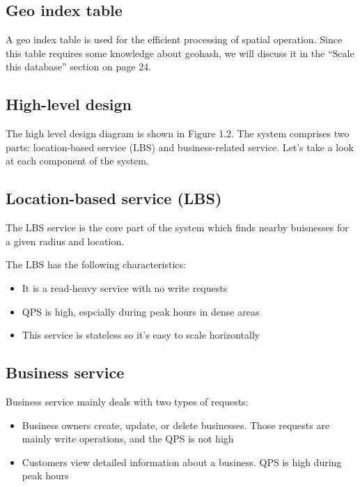 \documentclass{report}
\theoremstyle{definition}
\let\oldsubsection\subsection
\renewcommand{\subsection}{\oldsubsection*}
\begin{document}
\subsection{Geo index table}

A geo index table is used for the efficient processing of spatial operation. Since this table requires some knowledge about geohash, we will discuss it in the ``Scale this database'' section on page 24.

\subsection{High-level design}

The high level design diagram is shown in Figure 1.2. The system comprises two parts: location-based service (LBS) and business-related service. Let's take a look at each component of the system.

\subsection{Location-based service (LBS)}

The LBS service is the core part of the system which finds nearby buisnesses for a given radius and location.

The LBS has the following characteristics:

\begin{itemize}
\item
It is a read-heavy service with no write requests
\item
QPS is high, espcially during peak hours in dense areas
\item
This service is stateless so it's easy to scale horizontally
\end{itemize}

\subsection{Business service}

Business service mainly deals with two types of requests:

\begin{itemize}
\item
Business owners create, update, or delete businesses. Those requests are mainly write operations, and the QPS is not high
\item
Customers view detailed information about a business. QPS is high during peak hours
\end{itemize}
\end{document}

